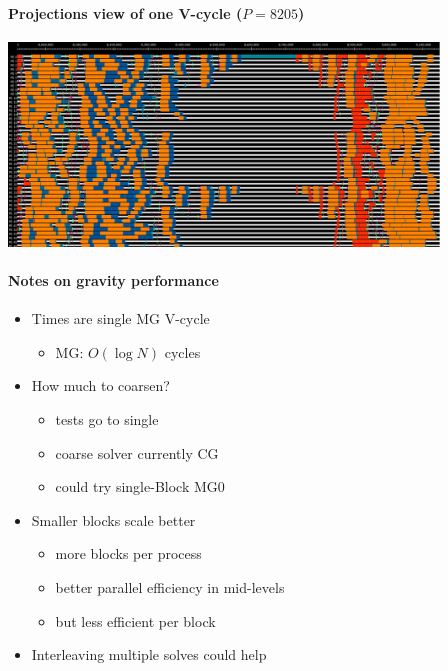 \begin{frame}[fragile,label=ss-recent-gravity] 
\secframetitle{\ssRecentGravity}
\framesubtitle{Projections view of one V-cycle ($P=8205$)}
  \begin{center}
    \vspace{-0.1in}
    \begin{minipage}{4.5in}
          \includegraphics[width=4.5in]{mg0-vcycle-new-2.pdf}
    \end{minipage}
  \end{center}
\end{frame}
% 
%
%
%
%
%        
%
%
\begin{frame}[fragile,label=ss-recent-gravity] 
\secframetitle{\ssRecentGravity}
\framesubtitle{Notes on gravity performance}
\begin{itemize}
\item Times are single MG V-cycle
\begin{itemize}
\item MG: $O(\log N)$ cycles
\end{itemize}
\item  How much to coarsen?
\begin{itemize}
\item tests go to single 
\item coarse solver currently CG
\item could try single-Block MG0
\end{itemize}
\item Smaller blocks scale better
\begin{itemize}
\item  more blocks per process
\item better parallel efficiency in mid-levels
\item  but less efficient per block
\end{itemize}
\item Interleaving multiple solves could help
\end{itemize}
\end{frame}
